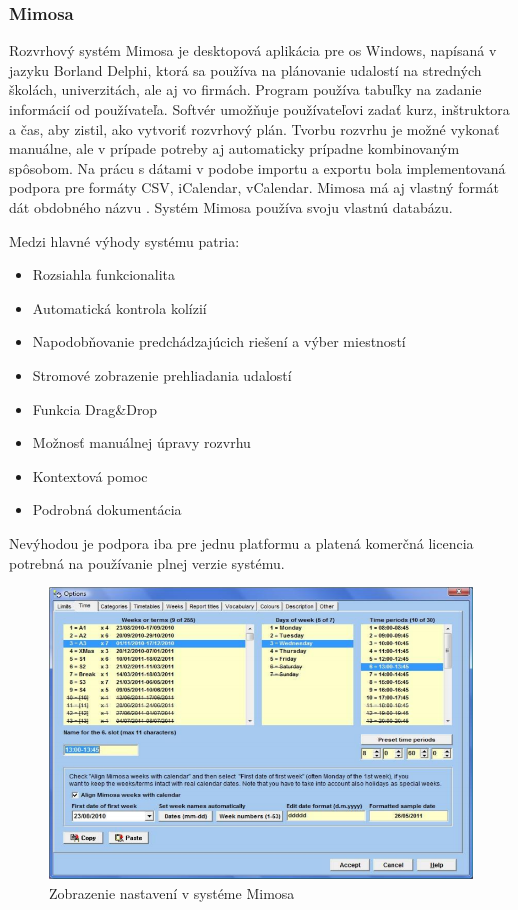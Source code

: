 \subsubsection{Mimosa}
\label{subsubsec:mimosa}

Rozvrhový systém Mimosa je desktopová aplikácia pre \acrshort{os} Windows, napísaná v jazyku
Borland Delphi, ktorá sa používa na plánovanie udalostí na stredných školách, univerzitách,
ale aj vo firmách. Program používa tabuľky na zadanie informácií od používateľa. Softvér
umožňuje používateľovi zadať kurz, inštruktora a čas, aby zistil, ako vytvoriť rozvrhový plán.
Tvorbu rozvrhu je možné vykonať manuálne, ale v prípade potreby aj automaticky prípadne
 kombinovaným spôsobom. Na prácu s dátami v podobe importu a exportu bola implementovaná
podpora pre formáty CSV, iCalendar, vCalendar. Mimosa má aj vlastný formát dát obdobného názvu \cite{mimosa}.
Systém Mimosa používa svoju vlastnú databázu.

Medzi hlavné výhody systému patria:
\begin{itemize}
\item Rozsiahla funkcionalita
\item Automatická kontrola kolízií
\item Napodobňovanie predchádzajúcich riešení a výber miestností
\item Stromové zobrazenie prehliadania udalostí
\item Funkcia Drag\&Drop
\item Možnosť manuálnej úpravy rozvrhu
\item Kontextová pomoc
\item Podrobná dokumentácia
\end{itemize}

Nevýhodou je podpora iba pre jednu platformu a platená komerčná licencia potrebná na používanie plnej
verzie systému.

\begin{figure}[ht]
  \centering
  \includegraphics[width=0.71\columnwidth]{img/mimosa_1.png}
  \caption{\label{fig:mimosa1_gui} Zobrazenie nastavení v systéme Mimosa \cite{mimosa}}
\end{figure}


